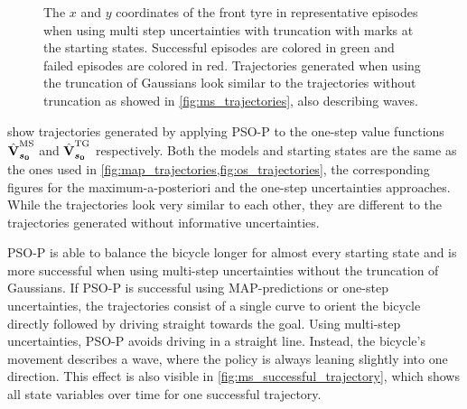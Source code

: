 \begin{figure}[p]
    \centering
    \caption[Episodes using multi step uncertainties with truncation]{
        The $x$ and $y$ coordinates of the front tyre in representative episodes when using multi step uncertainties with truncation with marks at the starting states.
        Successful episodes are colored in green and failed episodes are colored in red.
        Trajectories generated when using the truncation of Gaussians look similar to the trajectories without truncation as showed in \cref{fig:ms_trajectories}, also describing waves.
    }
    \label{fig:ms_truncation_trajectories}
\end{figure}
 show trajectories generated by applying PSO-P to the one-step value functions $\operatorname{\hat{\operatorname{\mathbf{V}}}}^{\text{MS}}_{\bm{s_0}}$ and $\operatorname{\hat{\operatorname{\mathbf{V}}}}^{\text{TG}}_{\bm{s_0}}$ respectively.
Both the models and starting states are the same as the ones used in \cref{fig:map_trajectories,fig:os_trajectories}, the corresponding figures for the maximum-a-posteriori and the one-step uncertainties approaches.
While the trajectories look very similar to each other, they are different to the trajectories generated without informative uncertainties.

PSO-P is able to balance the bicycle longer for almost every starting state and is more successful when using multi-step uncertainties without the truncation of Gaussians.
If PSO-P is successful using MAP-predictions or one-step uncertainties, the trajectories consist of a single curve to orient the bicycle directly followed by driving straight towards the goal.
Using multi-step uncertainties, PSO-P avoids driving in a straight line.
Instead, the bicycle's movement describes a wave, where the policy is always leaning slightly into one direction.
This effect is also visible in \cref{fig:ms_successful_trajectory}, which shows all state variables over time for one successful trajectory.

